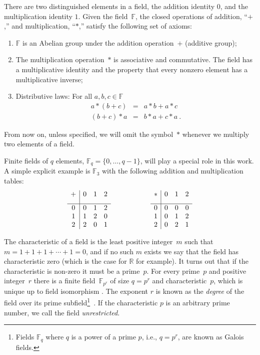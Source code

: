 \documentclass[twoside]{iuphd}
\newcommand{\gmult}{*}
\newcommand{\Fpx}[1]{\mathbb{F}_{#1}}
\newcommand{\Fq}{\mathbb{F}_{q}}
\newcommand{\ff}[1]{\mathbb{F}_{#1}}
\begin{document}
There are two distinguished elements in a field, the addition identity
$0$, and the multiplication identity $1$. Given the field~$\mathbb{F}$,
the closed operations of addition, ``$+$,'' and multiplication,
``$\gmult$,'' satisfy the following set of axioms: 
\begin{enumerate}
\item $\mathbb{F}$ is an Abelian group under the addition operation~$+$
(additive group); 
\item The multiplication operation~$\gmult$ is associative and commutative.
The field has a multiplicative identity and the property that every
nonzero element has a multiplicative inverse; 
\item Distributive laws: For all $a,b,c\in\mathbb{F}$ 
\begin{eqnarray}
a\gmult(b+c) & = & a\gmult b+a\gmult c\\
(b+c)\gmult a & = & b\gmult a+c\gmult a\ .
\end{eqnarray}
\end{enumerate}
\noindent From now on, unless specified, we will omit the symbol~$\gmult$
whenever we multiply two elements of a field.

Finite fields of $q$ elements, $\Fq=\{0,\ldots,q-1\}$, will play
a special role in this work. A simple explicit example is $\mathbb{F}_{3}$
with the following addition and multiplication tables: 
\[
\begin{array}{c|ccc}
+ & 0 & 1 & 2\\[0.1in]
\hline 0 & 0 & 1 & 2\\
1 & 1 & 2 & 0\\
2 & 2 & 0 & 1
\end{array}\hspace*{2cm}\begin{array}{c|ccc}
\gmult & 0 & 1 & 2\\[0.1in]
\hline 0 & 0 & 0 & 0\\
1 & 0 & 1 & 2\\
2 & 0 & 2 & 1
\end{array}
\]

The characteristic of a field is the least positive integer~$m$
such that $m=1+1+1+\cdots+1=0$, and if no such $m$ exists we say
that the field has characteristic zero (which is the case for $\mathbb{R}$
for example). It turns out that if the characteristic is non-zero
it must be a prime~$p$. For every prime~$p$ and positive integer~$r$
there is a finite field~$\Fpx{p^{r}}$ of size $q=p^{r}$ and characteristic~$p$,
which is unique up to field isomorphism \cite{Artin1991,DummitFoote2004}.
The exponent $r$ is known as the \emph{degree} of the field over
its prime subfield\footnote{ Fields $\ff{q}$ where $q$ is a power of a prime $p$, i.e., $q=p^{r}$,
are known as Galois fields.}~\cite{GT.ref}. If the characteristic $p$ is an arbitrary prime
number, we call the field \emph{unrestricted}.
\end{document}
